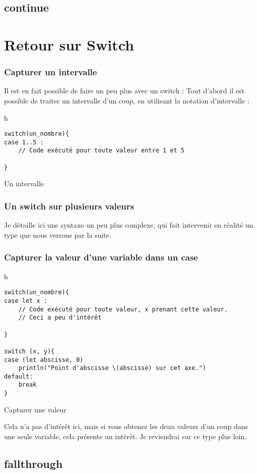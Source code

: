 \subsection{continue}

\section{Retour sur Switch}

\subsubsection{Capturer un intervalle} %
Il est en fait possible de faire un peu plus avec un switch :
Tout d'abord il est possible de traiter un intervalle d'un coup, en utilisant la notation d'intervalle :
\begin{listing}{h}
\begin{verbatim}
switch(un_nombre){
case 1..5 :
    // Code exécuté pour toute valeur entre 1 et 5

}
\end{verbatim}
\caption{Un intervalle}
\end{listing}
\subsubsection{Un switch sur plusieurs valeurs}
Je détaille ici une syntaxe un peu plus complexe, qui fait intervenir en réalité un type que nous verrons par la suite.

\subsubsection{Capturer la valeur d'une variable dans un case}

\begin{listing}{h}
\begin{verbatim}
switch(un_nombre){
case let x :
    // Code exécuté pour toute valeur, x prenant cette valeur.
    // Ceci a peu d'intérêt

}

switch (x, y){
case (let abscisse, 0)
    println("Point d'abscisse \(abscisse) sur cet axe.")
default:
    break
}

\end{verbatim}
\caption{Capturer une valeur}
\end{listing}%
Cela n'a pas d'intérêt ici, mais si vous obtenez les deux valeurs d'un coup dans une seule variable, cela présente un intérêt. Je reviendrai sur ce type plus loin.
\subsection{fallthrough}
